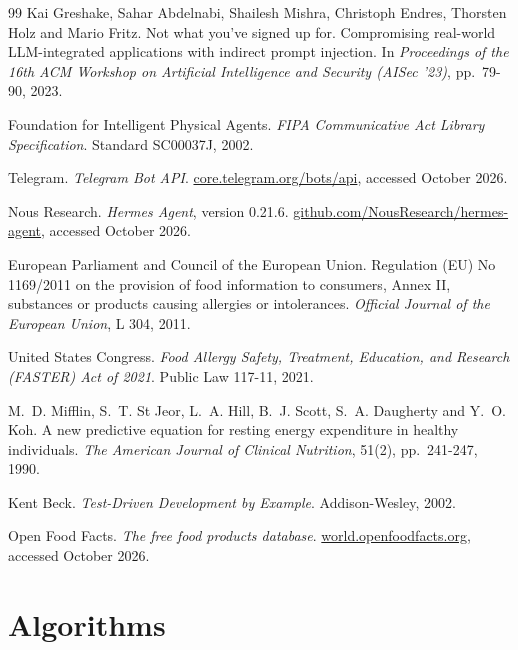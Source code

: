 \documentclass[11pt,a4paper]{article}
\begin{document}
\begin{thebibliography}{99}
Kai Greshake, Sahar Abdelnabi, Shailesh Mishra, Christoph Endres, Thorsten Holz and Mario Fritz. Not
what you've signed up for. Compromising real-world LLM-integrated applications with indirect prompt
injection. In \emph{Proceedings of the 16th ACM Workshop on Artificial Intelligence and Security
(AISec '23)}, pp.~79-90, 2023.

Foundation for Intelligent Physical Agents. \emph{FIPA Communicative Act Library Specification}.
Standard SC00037J, 2002.

Telegram. \emph{Telegram Bot API}.
\href{https://core.telegram.org/bots/api}{core.telegram.org/bots/api}, accessed October 2026.

Nous Research. \emph{Hermes Agent}, version 0.21.6.
\href{https://github.com/NousResearch/hermes-agent}{github.com/NousResearch/hermes-agent}, accessed
October 2026.

European Parliament and Council of the European Union. Regulation (EU) No 1169/2011 on the provision of
food information to consumers, Annex II, substances or products causing allergies or intolerances.
\emph{Official Journal of the European Union}, L 304, 2011.

United States Congress. \emph{Food Allergy Safety, Treatment, Education, and Research (FASTER) Act of
2021}. Public Law 117-11, 2021.

M.~D. Mifflin, S.~T. St Jeor, L.~A. Hill, B.~J. Scott, S.~A. Daugherty and Y.~O. Koh. A new predictive
equation for resting energy expenditure in healthy individuals. \emph{The American Journal of Clinical
Nutrition}, 51(2), pp.~241-247, 1990.

Kent Beck. \emph{Test-Driven Development by Example}. Addison-Wesley, 2002.

Open Food Facts. \emph{The free food products database}.
\href{https://world.openfoodfacts.org}{world.openfoodfacts.org}, accessed October 2026.

\end{thebibliography}

\newpage
\appendix

\section{Algorithms}\label{app:alg}
\end{document}

